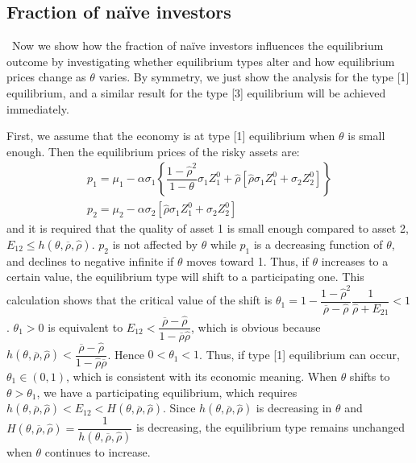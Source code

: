 \documentclass[10pt]{article}
\begin{document}
\subsection{Fraction of na\"ive investors}

\quad \ 
Now we show how the fraction of na\"ive investors influences the equilibrium outcome by investigating whether equilibrium types alter and how equilibrium prices change as $ \theta $ varies. By symmetry, we just show the analysis for the type [1] equilibrium, and a similar result for the type [3] equilibrium will be achieved immediately.

First, we assume that the economy is at type [1] equilibrium when $ \theta $ is small enough. Then the equilibrium prices of the risky assets are:
\begin{eqnarray*}
& p_1 = \mu_1 - \alpha \sigma_1 \left\{ \dfrac{1 - {\hat \rho}^2}{1 - \theta} \sigma_1 Z_1^0 + {\hat \rho} \left[ {\hat \rho} \sigma_1 Z_1^0 + \sigma_2 Z_2^0 \right] \right\} & \\
& p_2 = \mu_2 - \alpha \sigma_2 \left[ {\hat \rho} \sigma_1 Z_1^0 + \sigma_2 Z_2^0 \right] &
\end{eqnarray*}
and it is required that the quality of asset 1 is small enough compared to asset 2, $ E_{1 2} \leqslant h (\theta, \overline{\rho}, {\hat \rho}) $. $ p_2 $ is not affected by $ \theta $ while $ p_1 $ is a decreasing function of $ \theta $, and declines to negative infinite if $ \theta $ moves toward 1. Thus, if $ \theta $ increases to a certain value, the equilibrium type will shift to a participating one. This calculation shows that the critical value of the shift is $ \theta_1 = 1 - \dfrac{1 - {\hat \rho}^2}{\overline{\rho} - {\hat \rho}} \dfrac{1}{{\hat \rho} + E_{2 1}} < 1 $. $ \theta_1 > 0 $ is equivalent to $ E_{1 2} < \dfrac{\overline{\rho} - {\hat \rho}}{1 - \overline{\rho} {\hat \rho}} $, which is obvious because $ h (\theta, \overline{\rho}, {\hat \rho}) < \dfrac{\overline{\rho} - {\hat \rho}}{1 - {\hat \rho} \overline{\rho}} $. Hence $ 0 < \theta_1 < 1 $. Thus, if type [1] equilibrium can occur, $ \theta_1 \in (0, 1) $, which is consistent with its economic meaning. When $ \theta $ shifts to $ \theta > \theta_1 $, we have a participating equilibrium, which requires $ h (\theta, \overline{\rho}, {\hat \rho}) < E_{1 2} < H (\theta, \overline{\rho}, {\hat \rho}) $. Since $ h (\theta, \overline{\rho}, {\hat \rho}) $ is decreasing in $ \theta $ and $ H (\theta, \overline{\rho}, {\hat \rho}) = \dfrac{1}{h (\theta, \overline{\rho}, {\hat \rho})} $ is decreasing, the equilibrium type remains unchanged when $ \theta $ continues to increase.
\end{document}
